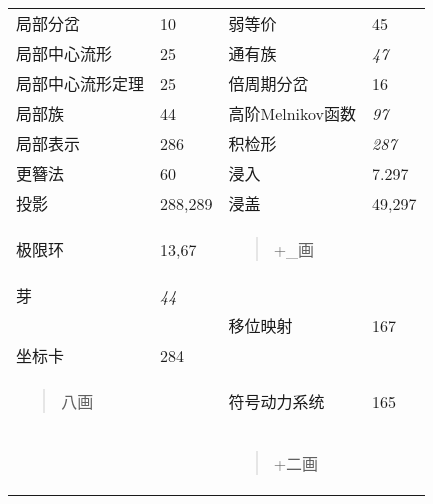 \begin{longtable}[]{@{}llll@{}}
局部分岔 & 10 & 弱等价 & 45\tabularnewline
局部中心流形 & 25 & 通有族 & \emph{47}\tabularnewline
局部中心流形定理 & 25 & 倍周期分岔 & 16\tabularnewline
局部族 & 44 & 高阶Melnikov函数 & \emph{97}\tabularnewline
局部表示 & 286 & 积检形 & \emph{287}\tabularnewline
更簪法 & 60 & 浸入 & 7.297\tabularnewline
投影 & 288,289 & 浸盖 & 49,297\tabularnewline
\begin{minipage}[t]{0.22\columnwidth}\raggedright
极限环\strut
\end{minipage} & \begin{minipage}[t]{0.22\columnwidth}\raggedright
13,67\strut
\end{minipage} & \begin{minipage}[t]{0.22\columnwidth}\raggedright
\begin{quote}
+\_画
\end{quote}\strut
\end{minipage} & \begin{minipage}[t]{0.22\columnwidth}\raggedright
\strut
\end{minipage}\tabularnewline
芽 & \emph{44} & &\tabularnewline
& & 移位映射 & 167\tabularnewline
坐标卡 & 284 & &\tabularnewline
\begin{minipage}[t]{0.22\columnwidth}\raggedright
\begin{quote}
八画
\end{quote}\strut
\end{minipage} & \begin{minipage}[t]{0.22\columnwidth}\raggedright
\strut
\end{minipage} & \begin{minipage}[t]{0.22\columnwidth}\raggedright
符号动力系统\strut
\end{minipage} & \begin{minipage}[t]{0.22\columnwidth}\raggedright
165\strut
\end{minipage}\tabularnewline
\begin{minipage}[t]{0.22\columnwidth}\raggedright
\strut
\end{minipage} & \begin{minipage}[t]{0.22\columnwidth}\raggedright
\strut
\end{minipage} & \begin{minipage}[t]{0.22\columnwidth}\raggedright
\begin{quote}
+二画
\end{quote}\strut
\end{minipage} & \begin{minipage}[t]{0.22\columnwidth}\raggedright

\end{minipage}
\end{longtable}
